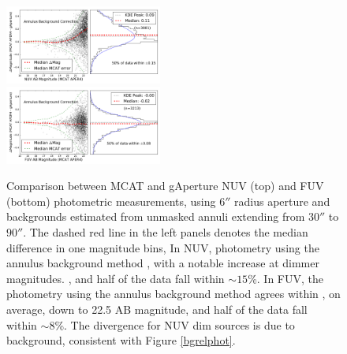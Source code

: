 \documentclass[trackchanges,preprint2]{aastex}
\begin{document}
\begin{figure}[h!]
\includegraphics[width=0.46\textwidth,keepaspectratio]{Fig05a.pdf}\\
\includegraphics[width=0.46\textwidth,keepaspectratio]{Fig05b.pdf}
\caption{Comparison between MCAT and gAperture NUV (top) and FUV (bottom) photometric measurements, using $6''$ radius aperture and backgrounds estimated from unmasked annuli extending from $30''$ to $90''$. The  dashed red line in the left panels denotes the median difference  in one magnitude bins,   In NUV, photometry using the annulus background method , with a notable increase at dimmer magnitudes. , and half of the data fall within $\sim 15$\%. In FUV, the photometry using the annulus background method agrees within , on average, down to 22.5 AB magnitude, and half of the data fall within $\sim 8$\%. The divergence for NUV dim sources is due to background, consistent with Figure \ref{bgrelphot}.
\label{annulusrelphot}}
\end{figure}
\end{document}
